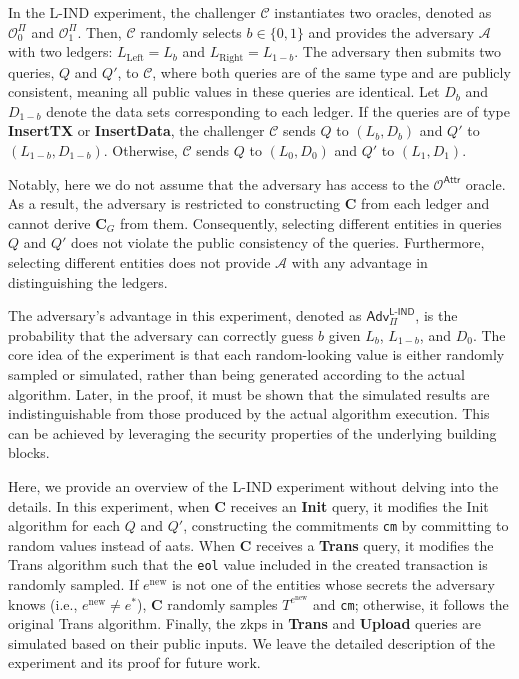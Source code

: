 In the \textsf{L-IND} experiment, the challenger $\mathcal{C}$ instantiates two oracles, denoted as $\mathcal{O}_0^\Pi$ and $\mathcal{O}_1^\Pi$. Then, $\mathcal{C}$ randomly selects $b \in \{0,1\}$ and provides the adversary $\mathcal{A}$ with two ledgers: $L_\text{Left} = L_b$ and $L_\text{Right} = L_{1-b}$. The adversary then submits two queries, $Q$ and $Q'$, to $\mathcal{C}$, where both queries are of the same type and are publicly consistent, meaning all public values in these queries are identical.  Let $D_b$ and $D_{1-b}$ denote the data sets corresponding to each ledger. If the queries are of type \textbf{InsertTX} or \textbf{InsertData}, the challenger $\mathcal{C}$ sends $Q$ to $(L_b, D_b)$ and $Q'$ to $(L_{1-b}, D_{1-b})$. Otherwise, $\mathcal{C}$ sends $Q$ to $(L_0, D_0)$ and $Q'$ to $(L_1, D_1)$.


Notably, here we do not assume that the adversary has access to the $\mathcal{O}^\mathsf{Attr}$ oracle. As a result, the adversary is restricted to constructing $\mathbf{C}$ from each ledger and cannot derive $\mathbf{C}_G$ from them. Consequently, selecting different entities in queries $Q$ and $Q'$ does not violate the public consistency of the queries. Furthermore,  selecting different entities  does not provide $\mathcal{A}$ with any advantage in distinguishing the ledgers.


The adversary's advantage in this experiment, denoted as $\mathsf{Adv}^{\textsf{L-IND}}_{\Pi}$, is the probability that the adversary can correctly guess $b$ given $L_b$, $L_{1-b}$, and $D_0$. The core idea of the experiment is that each random-looking value is either randomly sampled or simulated, rather than being generated according to the actual algorithm. Later, in the proof, it must be shown that the simulated results are indistinguishable from those produced by the actual algorithm execution. This can be achieved by leveraging the security properties of the underlying building blocks.



Here, we provide an overview of the \textsf{L-IND} experiment without delving into the details. In this experiment, when $\mathbf{C}$ receives an \textbf{Init} query, it modifies the \textsf{Init} algorithm for each $Q$ and $Q'$, constructing the commitments \texttt{cm} by committing to random values instead of \gls{aat}s. 
When $\mathbf{C}$ receives a \textbf{Trans} query, it modifies the \textsf{Trans} algorithm such that the \texttt{eol} value included in the created transaction is randomly sampled. If $e^\text{new}$ is not one of the entities whose secrets the adversary knows (i.e., $e^\text{new} \neq e^*$), $\mathbf{C}$ randomly samples $T^{e^\text{new}}$ and \texttt{cm}; otherwise, it follows the original \textsf{Trans} algorithm. 
Finally, the \gls{zkp}s in \textbf{Trans} and \textbf{Upload} queries are simulated based on their public inputs. We leave the detailed description of the experiment and its proof for future work. 

